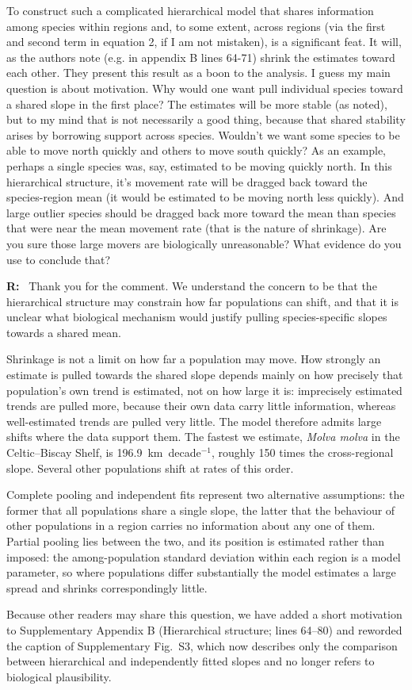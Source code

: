 \documentclass[11pt]{article}
\newcommand{\reviewer}[1]{\par\medskip\noindent\textcolor{revcolor}{#1}\par}
\newenvironment{reply}
{\par\smallskip\begingroup\color{replycolor}\noindent\textbf{R:}\ }
{\endgroup\par\medskip}
\begin{document}
\reviewer{To construct such a complicated hierarchical model that shares information among species within regions and, to some extent, across regions (via the first and second term in equation 2, if I am not mistaken), is a significant feat. It will, as the authors note (e.g. in appendix B lines 64-71) shrink the estimates toward each other. They present this result as a boon to the analysis. I guess my main question is about motivation. Why would one want pull individual species toward a shared slope in the first place? The estimates will be more stable (as noted), but to my mind that is not necessarily a good thing, because that shared stability arises by borrowing support across species. Wouldn't we want some species to be able to move north quickly and others to move south quickly? As an example, perhaps a single species was, say, estimated to be moving quickly north. In this hierarchical structure, it's movement rate will be dragged back toward the species-region mean (it would be estimated to be moving north less quickly). And large outlier species should be dragged back more toward the mean than species that were near the mean movement rate (that is the nature of shrinkage). Are you sure those large movers are biologically unreasonable? What evidence do you use to conclude that?}

\begin{reply}
Thank you for the comment. We understand the concern to be that the hierarchical structure may constrain how far populations can shift, and that it is unclear what biological mechanism would justify pulling species-specific slopes towards a shared mean.

Shrinkage is not a limit on how far a population may move. How strongly an estimate is pulled towards the shared slope depends mainly on how precisely that population's own trend is estimated, not on how large it is: imprecisely estimated trends are pulled more, because their own data carry little information, whereas well-estimated trends are pulled very little. The model therefore admits large shifts where the data support them. The fastest we estimate, \textit{Molva molva} in the Celtic--Biscay Shelf, is 196.9~km~decade$^{-1}$, roughly 150 times the cross-regional slope. Several other populations shift at rates of this order.

Complete pooling and independent fits represent two alternative assumptions: the former that all populations share a single slope, the latter that the behaviour of other populations in a region carries no information about any one of them. Partial pooling lies between the two, and its position is estimated rather than imposed: the among-population standard deviation within each region is a model parameter, so where populations differ substantially the model estimates a large spread and shrinks correspondingly little.

Because other readers may share this question, we have added a short motivation to Supplementary Appendix B (Hierarchical structure; lines 64--80) and reworded the caption of Supplementary Fig.~S3, which now describes only the comparison between hierarchical and independently fitted slopes and no longer refers to biological plausibility.
\end{reply}
\end{document}
